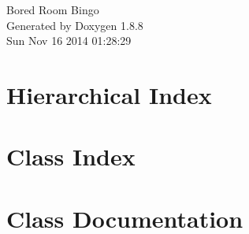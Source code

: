 \documentclass[twoside]{book}
\newcommand{\+}{\discretionary{\mbox{\scriptsize$\hookleftarrow$}}{}{}}
\newcommand{\clearemptydoublepage}{%
  \newpage{\pagestyle{empty}\cleardoublepage}%
}
\begin{document}
\hypersetup{pageanchor=false,
             bookmarks=true,
             bookmarksnumbered=true,
             pdfencoding=unicode
            }
\begin{titlepage}
\vspace*{7cm}
\begin{center}%
{\Large Bored Room Bingo }\\
\vspace*{1cm}
{\large Generated by Doxygen 1.8.8}\\
\vspace*{0.5cm}
{\small Sun Nov 16 2014 01:28:29}\\
\end{center}
\end{titlepage}
\clearemptydoublepage
\tableofcontents
\clearemptydoublepage
{}
\hypersetup{pageanchor=true}

\chapter{Hierarchical Index}

\chapter{Class Index}

\chapter{Class Documentation}



























\newpage
{}
{}
\printindex
\end{document}
